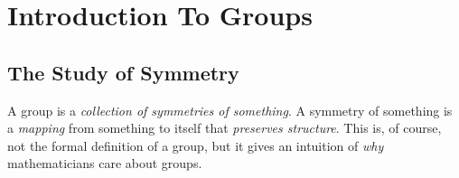 
\usepackage{xr}

\newcommand{\version}{0.9}
\newcommand{\volumenumber}{1}
\newcommand{\volumename}{Groups}
\newcommand{\volumeimage}{cover/Icosahedron.png}

\newcommand{\quotepagetext}{
    [The] axioms for a group are short and natural... [yet] somehow hidden behind these axioms is the monster simple group, a huge and extraordinary mathematical object, which appears to rely on numerous bizarre coincidences to exist. The axioms for groups give no obvious hint that anything like this exists.
}
\newcommand{\quotepageattribution}{Richard Borcherds, 2009}
\newcommand{\quotepagecitation}{\cite{cook_borcherds_2009}}

\newcommand{\prefacevolumetext}{
    For this volume, we explore one of the most fundamental structures in abstract algebra: the group. As with most books, we concentrate on abstract groups, and, in particular, on finite groups. We also discuss and explore some crucial results about the structure of groups. The content covered in this volume should be ample for one to understand the fundamentals of group theory.
}

\linespread{1.05}




\frontmatterpages

\chapter{Introduction To Groups}
\section{The Study of Symmetry}
A group is a \textit{collection of symmetries of something}. A symmetry of something is a \textit{mapping} from something to itself that \textit{preserves structure}. This is, of course, not the formal definition of a group, but it gives an intuition of \textit{why} mathematicians care about groups.

\begin{figure}
    \centering
\end{figure}

